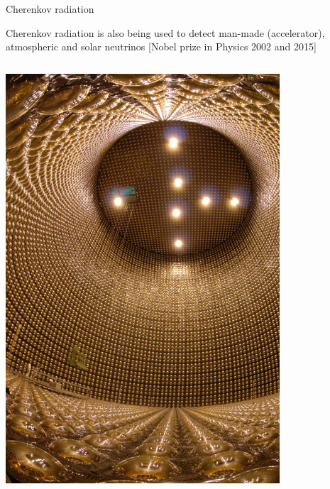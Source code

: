 %
%
%

\begin{frame}{Cherenkov radiation}

Cherenkov radiation is also being used to detect man-made (accelerator),
atmospheric and solar neutrinos [Nobel prize in Physics 2002 and 2015]

\begin{columns}
  \begin{column}{0.40\textwidth}
    \begin{center}
      \includegraphics[width=0.80\textwidth]{./images/photos/superk.jpg}\\
    \end{center}
  \end{column}
  \begin{column}{0.60\textwidth}
    \begin{center}

\end{center}
\end{column}
\end{columns}
\end{frame}
